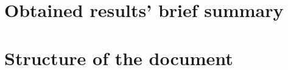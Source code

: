\section{Obtained results' brief summary}






\section{Structure of the document}
\label{sec:sod}


